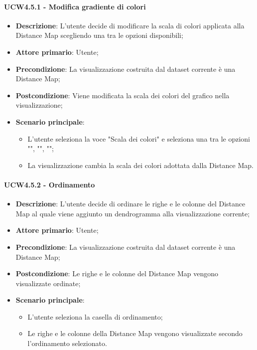 \paragraph{UCW4.5.1 - Modifica gradiente di colori}
\label{par:ucw4.5.1}
\begin{itemize}
    \item \textbf{Descrizione}: L'utente decide di modificare la scala di colori applicata alla Distance Map scegliendo una tra le opzioni disponibili;
    \item \textbf{Attore primario}: Utente;
    \item \textbf{Precondizione}: La visualizzazione costruita dal dataset corrente è una Distance Map;
    \item \textbf{Postcondizione}: Viene modificata la scala dei colori del grafico nella visualizzazione;
    \item \textbf{Scenario principale}:
    \begin{itemize}
        \item L'utente seleziona la voce "Scala dei colori" e seleziona una tra le opzioni  "", "", "";
        \item La visualizzazione cambia la scala dei colori adottata dalla Distance Map.
    \end{itemize}
\end{itemize}

\paragraph{UCW4.5.2 - Ordinamento}
\label{par:ucw4.5.2}
\begin{itemize}
    \item \textbf{Descrizione}: L'utente decide di ordinare le righe e le colonne del Distance Map al quale viene aggiunto un dendrogramma alla visualizzazione corrente;
    \item \textbf{Attore primario}: Utente;
    \item \textbf{Precondizione}: La visualizzazione costruita dal dataset corrente è una Distance Map;
    \item \textbf{Postcondizione}: Le righe e le colonne del Distance Map vengono visualizzate ordinate;
    \item \textbf{Scenario principale}:
    \begin{itemize}
        \item L'utente seleziona la casella di ordinamento;
        \item Le righe e le colonne della Distance Map vengono visualizzate secondo l'ordinamento selezionato.
    \end{itemize}
\end{itemize}

